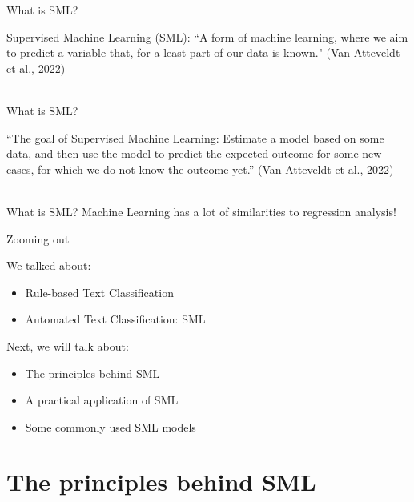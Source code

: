 \documentclass[compress]{beamer}
\begin{document}
\begin{frame}{What is SML?} 
	
Supervised Machine Learning (SML): “A form of machine learning, where we aim to predict a variable that, for a least part of our data is known." (Van Atteveldt et al., 2022) \\\

\end{frame}


\begin{frame}{What is SML?} 

“The goal of Supervised Machine Learning: Estimate a model based on some data, and then use the model to predict the expected outcome for some new cases, for which we do not know the outcome yet.” (Van Atteveldt et al., 2022) \\\

\end{frame}


\begin{frame}[fragile]{What is SML?} 
Machine Learning has a lot of similarities to regression analysis!
\end{frame}



\begin{frame}[fragile]{Zooming out} 
	
\begin{alertblock}{We talked about:}
\begin{itemize}
	\item Rule-based Text Classification
	\item Automated Text Classification: SML
\end{itemize}
\end{alertblock}
	
\begin{alertblock}{Next, we will talk about:}
\begin{itemize}
	\item The principles behind SML
	\item A practical application of SML
	\item Some commonly used SML models
\end{itemize}
\end{alertblock}	
\end{frame}


\section{The principles behind SML}
\end{document}
